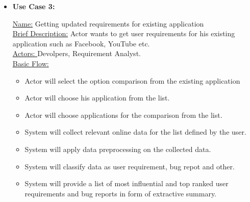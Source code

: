 \begin{itemize}
\item\textbf{ {Use Case 3:\\}}

 \underline {Name:} Getting updated requirements for existing application\\
 \underline{Brief Description:} Actor wants to get user requirements for his existing application such as Facebook, YouTube etc.\\
 \underline{Actors: } Devolpers, Requirement Analyst.\\
 \underline{Basic Flow:}
\begin {itemize}
\item{Actor will select the option comparison from the existing application}
\item{Actor will choose his application from the list.}
\item{Actor will choose applications for the comparison from the list.}
\item{System will collect relevant online data for the list defined by the user.}
\item{System will apply data preprocessing on the collected data.}
\item{System will classify data as user requirement, bug repot and other.}
\item{System will provide a list of most influential and top ranked user requirements and bug reports in form of extractive summary.}
\end{itemize}

\end{itemize}
